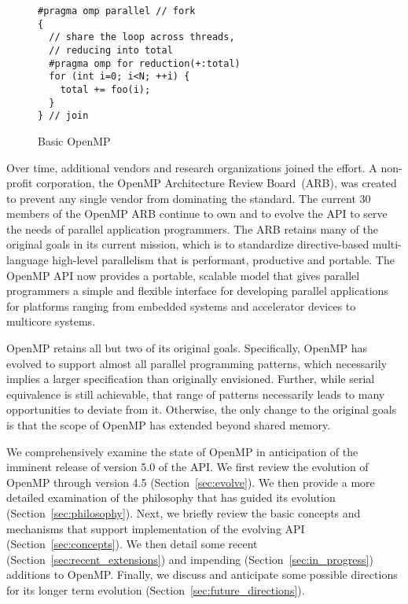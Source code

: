\begin{figure}
\begin{verbatim}
#pragma omp parallel // fork
{
  // share the loop across threads,
  // reducing into total
  #pragma omp for reduction(+:total)
  for (int i=0; i<N; ++i) {
    total += foo(i);
  }
} // join
\end{verbatim}
\caption{Basic OpenMP\label{fig:basic}}
\end{figure}

Over time, additional vendors and research organizations joined the effort.  
A non-profit corporation, the OpenMP Architecture Review Board~(ARB), was 
created to prevent any single vendor from dominating the standard. The 
current 30 members of the OpenMP ARB continue to own and to evolve the API 
to serve the needs of parallel application programmers. The ARB retains many 
of the original goals in its current mission, which is to standardize 
directive-based multi-language high-level parallelism that is performant, 
productive and portable. The OpenMP API now provides a portable, scalable 
model that gives parallel programmers a simple and flexible interface for 
developing parallel applications for platforms ranging from embedded systems 
and accelerator devices to multicore systems.

OpenMP retains all but two of its original goals. Specifically, OpenMP has 
evolved to support almost all parallel programming patterns, which necessarily
implies a larger specification than originally envisioned. Further, while 
serial equivalence is still achievable, that range of patterns necessarily 
leads to many opportunities to deviate from it. Otherwise, the only change 
to the original goals is that the scope of OpenMP has extended beyond 
shared memory. 

We comprehensively examine the state of OpenMP in anticipation of the imminent 
release of version 5.0 of the API. We first review the evolution of OpenMP 
through version 4.5 (Section~\ref{sec:evolve}). We then provide a more 
detailed examination of the philosophy that has guided its evolution 
(Section~\ref{sec:philosophy}). Next, we briefly review the basic concepts 
and mechanisms that support implementation of the evolving API 
(Section~\ref{sec:concepts}). We then detail some recent 
(Section~\ref{sec:recent_extensions}) and impending 
(Section~\ref{sec:in_progress}) additions to OpenMP. Finally, we discuss
and anticipate some possible directions for its longer term evolution
(Section~\ref{sec:future_directions}).
